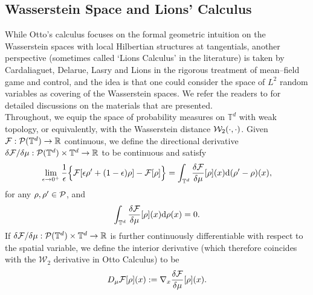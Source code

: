 \subsection{Wasserstein Space and Lions' Calculus}\label{sec:Wasserstein-Lions}

While Otto's calculus focuses on the formal geometric intuition on the Wasserstein spaces with local Hilbertian structures at tangentials, another perspective (sometimes called `Lions Calculus' in the literature) is taken by Cardaliaguet, Delarue, Lasry and Lions in the rigorous treatment of mean--field game and control, and the idea is that one could consider the space of $L^2$ random variables as covering of the Wasserstein spaces. We refer the readers to \cite{C10, BLPC17, CDLL19, CD22} for detailed discussions on the materials that are presented. \\

Throughout, we equip the space of probability measures on $\mathbb{T}^d$ with weak topology, or equivalently, with the Wasserstein distance $\mathcal{W}_2(\cdot,\cdot)$. Given $\mathcal{F}: \mathcal{P}(\mathbb{T}^d) \to \mathbb{R}$ continuous, we define the directional derivative $\delta \mathcal{F}/\delta \mu: \mathcal{P}(\mathbb{T}^d) \times \mathbb{T}^d \to \mathbb{R}$ to be continuous and satisfy 
\begin{align*}
    \lim_{\epsilon \to 0^+} \frac{1}{\epsilon} \Big\{\mathcal{F}[\epsilon \rho' + (1 - \epsilon)\rho ] - \mathcal{F}[\rho]\Big\}= \int_{\mathbb{T}^d} \frac{\delta \mathcal{F}}{\delta \mu}[\rho](x)  \mathrm{d}(\rho' - \rho)(x),
 \end{align*}
for any $\rho, \rho' \in \mathcal{P}$, and
\begin{align*}
\int_{\mathbb{T}^d}  \frac{\delta \mathcal{F}}{\delta \mu}[\rho](x)\mathrm{d}\rho(x) = 0.
\end{align*} 
If $\delta \mathcal{F} / \delta \mu : \mathcal{P}(\mathbb{T}^d) \times \mathbb{T}^d \to \mathbb{R}$ is further continuously differentiable with respect to the spatial variable, we define the interior derivative (which therefore coincides with the $\mathcal{W}_2$ derivative in Otto Calculus) to be 
\begin{align*}
D_{\mu} \mathcal{F}[\rho](x) := \nabla_x \frac{\delta \mathcal{F}}{\delta \mu}[\rho](x).
\end{align*}

